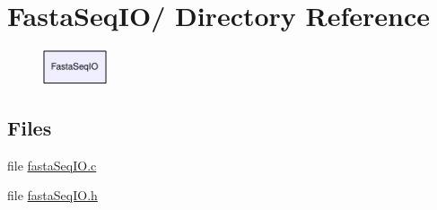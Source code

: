 \hypertarget{dir_000000}{
\section{Fasta\-Seq\-IO/ Directory Reference}
\label{dir_000000}
}


\begin{figure}[H]
\begin{center}
\leavevmode
\includegraphics[width=53pt]{dir_000000_dep}
\end{center}
\end{figure}
\subsection*{Files}
\begin{CompactItemize}
\item 
file \hyperlink{fastaSeqIO_8c}{fasta\-Seq\-IO.c}
\item 
file \hyperlink{fastaSeqIO_8h}{fasta\-Seq\-IO.h}
\end{CompactItemize}
